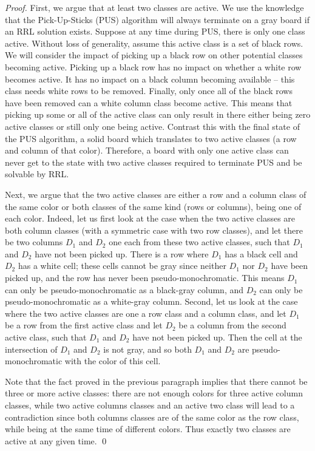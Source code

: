 \begin{proof}
First, we argue that at least two classes are active. 
We use the knowledge that the Pick-Up-Sticks (PUS) algorithm will always
terminate on a gray board if an RRL solution exists.
Suppose at any time during PUS, there is only one class active.
Without loss of generality, assume this active class is a set of black rows.
We will consider the impact of picking up a black row on other potential
classes becoming active.
Picking up a black row has no impact on whether a white row becomes active.
It has no impact on a black column becoming available -- this class needs
white rows to be removed.
Finally, only once all of the black rows have been removed can a white
column class become active.
This means that picking up some or all of the active class can only result
in there either being zero active classes or still only one being active.
Contrast this with the final state of the PUS algorithm, a solid board which
translates to two active classes (a row and column of that color).
Therefore, a board with only one active class can never get to the state
with two active classes required to terminate PUS and be solvable by RRL.

Next, we argue that the 
two active classes are either a row and a column
class of the same color or both classes of the same kind (rows or columns),
 being one of each color. 
Indeed, let us first look at the case when the two  active classes are
both column classes (with a symmetric case with two row classes),
and let there be two columns $D_1$ and $D_2$ one each from these two
active classes, such that $D_1$ and $D_2$ have not been picked up.
There is a row where $D_1$ has a black cell and $D_2$
has a white cell; these cells cannot be gray
since neither $D_1$ nor $D_2$ have been picked up, and the row
has never been pseudo-monochromatic. This means $D_1$ can only
be pseudo-monochromatic as a black-gray column, and $D_2$ can only
be pseudo-monochromatic as a white-gray column.
Second, let us look at the case where the two  active classes are
one a row class and a column class, and let $D_1$ be a row from
the first active class and let $D_2$ be a column from
the second active class, such that $D_1$ and $D_2$ have not been picked up.
Then the cell at the intersection of $D_1$ and $D_2$
is not gray, and so both $D_1$ and $D_2$ are pseudo-monochromatic
with the color of this cell.

Note that the fact proved in the previous paragraph
implies that there cannot be three or more active classes:
there are not enough colors for three active column classes,
while two active columns classes and an active two class will
lead to a contradiction since both columns classes
are of the same color as the row class, while being at the same time of
different colors. Thus exactly two classes are active at any given time.
\qed
\end{proof}

